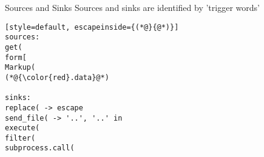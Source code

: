 \begin{frame}
\end{frame}

\begin{frame}[fragile]{Sources and Sinks}
  Sources and sinks are identified by 'trigger words'
  \begin{lstlisting}[style=default, escapeinside={(*@}{@*)}]
sources:
get(
form[
Markup(
(*@{\color{red}.data}@*)

sinks:
replace( -> escape
send_file( -> '..', '..' in
execute(
filter(
subprocess.call(
\end{lstlisting}

\end{frame}
